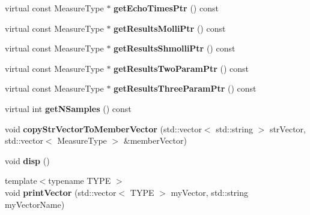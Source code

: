 \begin{DoxyCompactItemize}
\item 
virtual const Measure\+Type $\ast$ {\bfseries get\+Echo\+Times\+Ptr} () const \hypertarget{class_ox_1_1_test_data_afff44a9b347b3d1113befa1e6c7fcfad}{}\label{class_ox_1_1_test_data_afff44a9b347b3d1113befa1e6c7fcfad}

\item 
virtual const Measure\+Type $\ast$ {\bfseries get\+Results\+Molli\+Ptr} () const \hypertarget{class_ox_1_1_test_data_a1cb0dc25db322b7ba075e0ab7f5d6567}{}\label{class_ox_1_1_test_data_a1cb0dc25db322b7ba075e0ab7f5d6567}

\item 
virtual const Measure\+Type $\ast$ {\bfseries get\+Results\+Shmolli\+Ptr} () const \hypertarget{class_ox_1_1_test_data_ad822f6946548df6c68cf6cb007030702}{}\label{class_ox_1_1_test_data_ad822f6946548df6c68cf6cb007030702}

\item 
virtual const Measure\+Type $\ast$ {\bfseries get\+Results\+Two\+Param\+Ptr} () const \hypertarget{class_ox_1_1_test_data_a941d1027bc1ee142c5cf8ef1dbbefa7e}{}\label{class_ox_1_1_test_data_a941d1027bc1ee142c5cf8ef1dbbefa7e}

\item 
virtual const Measure\+Type $\ast$ {\bfseries get\+Results\+Three\+Param\+Ptr} () const \hypertarget{class_ox_1_1_test_data_a6670e22176b7a599e2ff0e193a271d83}{}\label{class_ox_1_1_test_data_a6670e22176b7a599e2ff0e193a271d83}

\item 
virtual int {\bfseries get\+N\+Samples} () const \hypertarget{class_ox_1_1_test_data_a93fc01cb722f3cadbaa530068c0079da}{}\label{class_ox_1_1_test_data_a93fc01cb722f3cadbaa530068c0079da}

\item 
void {\bfseries copy\+Str\+Vector\+To\+Member\+Vector} (std\+::vector$<$ std\+::string $>$ str\+Vector, std\+::vector$<$ Measure\+Type $>$ \&member\+Vector)\hypertarget{class_ox_1_1_test_data_a4c5bb0b0296218d61c608a8592900c39}{}\label{class_ox_1_1_test_data_a4c5bb0b0296218d61c608a8592900c39}

\item 
void {\bfseries disp} ()\hypertarget{class_ox_1_1_test_data_ac19364ea614dad392eefb4dbeb8a7903}{}\label{class_ox_1_1_test_data_ac19364ea614dad392eefb4dbeb8a7903}

\item 
{\footnotesize template$<$typename T\+Y\+PE $>$ }\\void {\bfseries print\+Vector} (std\+::vector$<$ T\+Y\+PE $>$ my\+Vector, std\+::string my\+Vector\+Name)\hypertarget{class_ox_1_1_test_data_a3de0e44dba2bd5e3b7556d662575378a}{}\label{class_ox_1_1_test_data_a3de0e44dba2bd5e3b7556d662575378a}

\end{DoxyCompactItemize}
